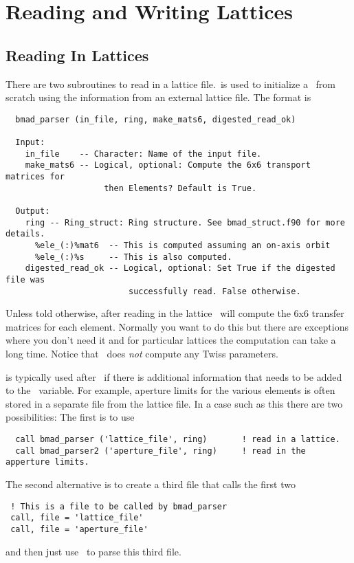 \chapter{Reading and Writing Lattices}

\section{Reading In Lattices}

There are two subroutines to read in a lattice file.\bmadparser\ is
used to initialize a \ringstruct\ from scratch using the information
from an external lattice file. The format is
\begin{verbatim}
  bmad_parser (in_file, ring, make_mats6, digested_read_ok) 

  Input:
    in_file    -- Character: Name of the input file.
    make_mats6 -- Logical, optional: Compute the 6x6 transport matrices for 
                    then Elements? Default is True.
 
  Output:
    ring -- Ring_struct: Ring structure. See bmad_struct.f90 for more details.
      %ele_(:)%mat6  -- This is computed assuming an on-axis orbit
      %ele_(:)%s     -- This is also computed.
    digested_read_ok -- Logical, optional: Set True if the digested file was
                         successfully read. False otherwise.
\end{verbatim}
Unless told otherwise, after reading in the lattice \bmadparser\ will
compute the 6x6 transfer matrices for each element. Normally you want
to do this but there are exceptions where you don't need it and for
particular lattices the computation can take a long time. Notice that
\bmadparser\ does {\em not} compute any Twiss parameters.

 is typically used after \bmadparser\ if there is 
additional information that needs to be added to the \ringstruct\
variable.  For example, aperture limits for the various elements is often
stored in a separate file from the lattice file. In a case such as this
there are two possibilities: The first is to use \sn{bmad\_parser2} 
\begin{verbatim}
  call bmad_parser ('lattice_file', ring)       ! read in a lattice.
  call bmad_parser2 ('aperture_file', ring)     ! read in the apperture limits.
\end{verbatim}
The second alternative is to create a third file that calls the first two
\begin{verbatim}
 ! This is a file to be called by bmad_parser
 call, file = 'lattice_file'
 call, file = 'aperture_file'
\end{verbatim}
and then just use \bmadparser\ to parse this third file.


